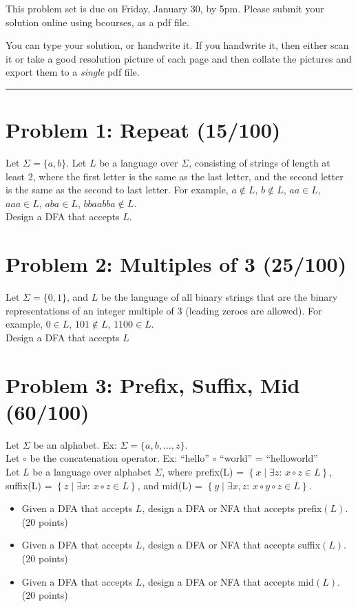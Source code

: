 \documentclass[11pt]{article}
\begin{document}


This problem set is due on Friday, January 30, by 5pm. Please submit your solution online using bcourses,
as a pdf file. 

You can type your solution, or handwrite it. If you handwrite it, then either
scan it or take a good resolution picture of each page and then collate the pictures
and export them to a {\em single} pdf file.

\bigskip

\hrule

\section*{Problem 1: Repeat (15/100)}


\noindent Let $\Sigma=\{a,b\}$. Let $L$ be a language over $\Sigma$,
consisting of strings of length at least 2,
where the first letter is the same as the last letter,
and the second letter is the same as the second to last letter.
For example, $ a \not\in L$, $b \not\in L$, $aa \in L$, $aaa \in L$, $aba \in L$, $bbaabba \not\in L$.\\

\noindent Design a DFA that accepts $L$.


\section*{Problem 2: Multiples of 3 (25/100)}

\noindent Let $\Sigma = \{0, 1\}$, and $L$ be the language of 
all binary strings that are the binary representations of an integer multiple of 3 (leading zeroes are
allowed).  For example, $0 \in L$, $101 \not \in L$, $1100 \in L$.\\
 
\noindent Design a DFA that accepts $L$


\section*{Problem 3: Prefix, Suffix, Mid (60/100)}
Let $\Sigma$ be an alphabet. {\color{Gray}Ex: $\Sigma=\{a, b, ..., z\}$}.\\
Let $\circ$ be the concatenation operator. {\color{Gray}Ex: ``hello'' $\circ$ ``world'' = ``helloworld''}\\
\noindent Let $L$ be a language over alphabet $\Sigma$, where
prefix(L) = $\left\{x \mid \exists z:\, x \circ z \in L\right\}$,
suffix(L) = $\left\{z \mid \exists x:\, x \circ z \in L\right\}$, and
mid(L) = $\left\{y \mid \exists x, z:\, x \circ y \circ z \in L\right\}$.

\begin{itemize}
\item Given a DFA that accepts $L$, design a DFA or NFA that accepts prefix$(L)$. (20 points)
\item Given a DFA that accepts $L$, design a DFA or NFA that accepts suffix$(L)$. (20 points)
\item Given a DFA that accepts $L$, design a DFA or NFA that accepts mid$(L)$. (20 points)
\end{itemize}
\end{document}
